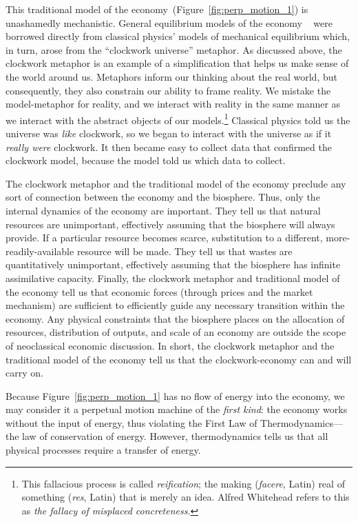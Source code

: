This traditional model of the economy~(Figure~\ref{fig:perp_motion_1}) 
is unashamedly mechanistic.
General equilibrium models of the economy
~\cite{Walras1892, Walras1993}
were borrowed directly from classical physics' models of 
mechanical equilibrium which, in turn, arose from the 
``clockwork universe'' metaphor.\cite{Ingrao1990}
As discussed above, 
the clockwork metaphor is an example  
of a simplification that helps us make sense of the world around us.
Metaphors inform our thinking about the real world,
but consequently,
they also constrain our ability to frame reality.
We mistake the model-metaphor for reality, and
we interact with reality in the same manner 
as we interact with the abstract objects of our
models.\footnote{This fallacious process is called
	\emph{reification}; the making (\emph{facere}, Latin) real of
	something (\emph{res}, Latin) that is merely an idea.
	Alfred Whitehead refers to this as
	\emph{the fallacy of misplaced concreteness}.\cite{Whitehead2011}
	}
Classical physics told us the universe was
\emph{like} clockwork, 
so we began to interact with the universe
as if it \emph{really were} clockwork.
It then became easy to collect data that confirmed the clockwork model,
because the model told us which data to collect.

The clockwork metaphor and the traditional model of the economy
preclude any sort of connection 
between the economy and the biosphere.
Thus, only the internal dynamics of the economy are important. 
They tell us that natural resources are unimportant, 
effectively assuming that the biosphere will always provide.
If a particular resource becomes scarce, 
substitution to a different, more-readily-available resource will be made.
They tell us that wastes are quantitatively unimportant, 
effectively assuming that the biosphere has infinite assimilative capacity.
Finally, the clockwork metaphor and traditional model of the economy 
tell us that economic forces 
(through prices and the market mechanism) 
are sufficient to efficiently guide any necessary transition
within the economy.
Any physical constraints that the biosphere places on 
the allocation of resources, distribution of outputs, and 
scale of an economy 
are outside the scope of neoclassical economic discussion.\cite{Daly1995}
In short, the clockwork metaphor and the traditional model of the economy 
tell us that the clockwork-economy can and will carry on.

Because Figure~\ref{fig:perp_motion_1} has no flow of energy
into the economy,
we may consider it a perpetual motion machine
of the \emph{first kind}:
the economy works without the input of energy, thus violating
the First Law of Thermodynamics---the 
law of conservation of energy.\cite{Rao2004}
However, thermodynamics tells us that all physical processes 
require a transfer of energy.


